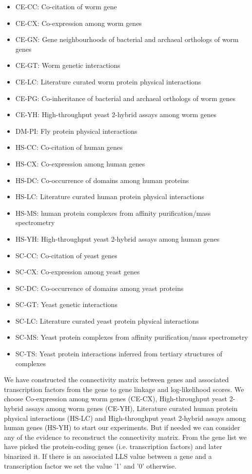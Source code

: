 \begin{itemize}
 \item CE-CC: 	Co-citation of worm gene
 \item CE-CX: 	Co-expression among worm genes
 \item CE-GN: 	Gene neighbourhoods of bacterial and archaeal orthologs of worm genes
 \item CE-GT: 	Worm genetic interactions
 \item CE-LC: 	Literature curated worm protein physical interactions
 \item CE-PG: 	Co-inheritance of bacterial and archaeal orthologs of worm genes
 \item CE-YH: 	High-throughput yeast 2-hybrid assays among worm genes
 \item DM-PI: 	Fly protein physical interactions
 \item HS-CC: 	Co-citation of human genes
 \item HS-CX: 	Co-expression among human genes
 \item HS-DC: 	Co-occurrence of domains among human proteins
 \item HS-LC: 	Literature curated human protein physical interactions
 \item HS-MS: 	human protein complexes from affinity purification/mass spectrometry
 \item HS-YH: 	High-throughput yeast 2-hybrid assays among human genes
 \item SC-CC: 	Co-citation of yeast genes
 \item SC-CX: 	Co-expression among yeast genes
 \item SC-DC: 	Co-occurrence of domains among yeast proteins
 \item SC-GT: 	Yeast genetic interactions
 \item SC-LC: 	Literature curated yeast protein physical interactions
 \item SC-MS: 	Yeast protein complexes from affinity purification/mass spectrometry
 \item SC-TS: 	Yeast protein interactions inferred from tertiary structures of complexes
\end{itemize}

We have constructed the connectivity matrix between genes and associated transcription factors 
from the gene to gene linkage and log-likelihood scores. 
We choose Co-expression among worm genes (CE-CX),
High-throughput yeast 2-hybrid assays among worm genes (CE-YH),
Literature curated human protein physical interactions (HS-LC) and 
High-throughput yeast 2-hybrid assays among human genes (HS-YH) to start our experiments.
But if needed we can consider any of the evidence to reconstruct the connectivity matrix.
From the gene list we have picked the protein-coding genes (i.e. transcription factors) and later 
binarized it. If there is an associated LLS value between a gene and a transcription factor we set the value '1' and 
'0' otherwise.

